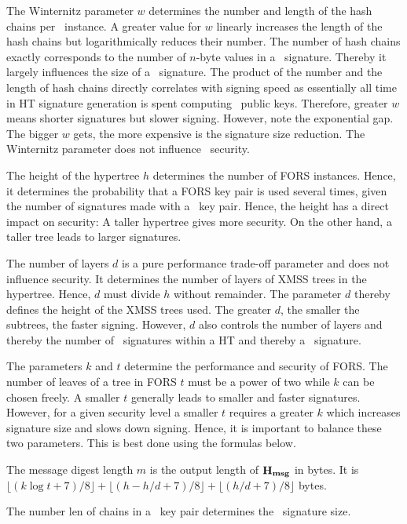 The Winternitz parameter $w$ determines the number and length of the hash chains per \WOTSCS\ instance. A greater value for $w$ linearly increases the length of the hash chains but logarithmically reduces their number. The number of hash chains exactly corresponds to the number of $n$-byte values in a \WOTSCS\ signature. Thereby it largely influences the size of a \SPHINCSA\ signature. The product of the number and the length of hash chains directly correlates with signing speed as essentially all time in HT signature generation is spent computing \WOTSCS\ public keys. Therefore, greater $w$ means shorter signatures but slower signing. However, note the exponential gap. The bigger $w$ gets, the more expensive is the signature size reduction. The Winternitz parameter does not influence \SPHINCSA\ security.

The height of the hypertree $h$ determines the number of FORS instances. Hence, it determines the probability that a FORS key pair is used several times, given the number of signatures made with a \SPHINCSA\ key pair. Hence, the height has a direct impact on security: A taller hypertree gives more security. On the other hand, a taller tree leads to larger signatures.

The number of layers $d$ is a pure performance trade-off parameter and does not influence security. It determines the number of layers of XMSS trees in the hypertree. Hence, $d$ must divide $h$ without remainder. The parameter $d$ thereby defines the height of the XMSS trees used. The greater $d$, the smaller the subtrees, the faster signing. However, $d$ also controls the number of layers and thereby the number of \WOTSCS\ signatures within a HT and thereby a \SPHINCSA\ signature.

The parameters $k$ and $t$ determine the performance and security of FORS. The number of leaves of a tree in FORS $t$ must be a power of two while $k$ can be chosen freely. A smaller $t$ generally leads to smaller and faster signatures. However, for a given security level a smaller $t$ requires a greater $k$ which increases signature size and slows down signing. Hence, it is important to balance these two parameters. This is best done using the formulas below.

The message digest length $m$ is the output length of $\mathbf{H_{msg}}$ in bytes. It is $\lfloor(k\log t+7)/8\rfloor+ \lfloor(h-h/d+7)/8\rfloor+\lfloor(h/d+7)/8\rfloor$ bytes.

The number len of chains in a \WOTSCS\ key pair determines the \WOTSCS\ signature size.


